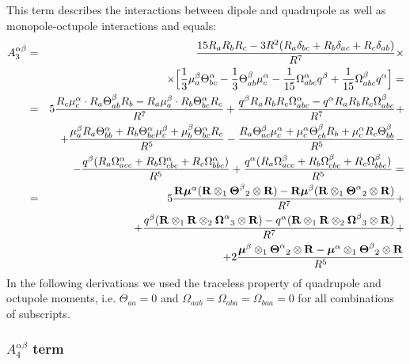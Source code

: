 \documentclass[a4paper,titlepage,twoside,fleqn]{article}
\newcommand{\BM}[1]{\ensuremath{\mbox{\boldmath${#1}$}}}
\begin{document}
This term describes the interactions between dipole 
and quadrupole as well as monopole-octupole interactions
and equals:
\begin{eqnarray}
A^{\alpha\beta}_3&=& \frac{15R_aR_bR_c-3R^2(R_a\delta_{bc}+R_b\delta_{ac}+R_c\delta_{ab})}{R^7} \times \\ \nonumber
& & \quad\times \Big[
           \frac{1}{3} {\mu}_a^{\beta} {\Theta}^{\alpha}_{bc} - 
           \frac{1}{3} {\Theta}^{\beta}_{ab} {\mu}_c^{\alpha} -
           \frac{1}{15} {\Omega}^{\alpha}_{abc} {q}^{\beta} +
           \frac{1}{15} {\Omega}^{\beta}_{abc} {q}^{\alpha}
           \Big] = \\ \nonumber
&=&
5\frac{R_c\mu_c^{\alpha} \cdot R_a\Theta_{ab}^{\beta}R_b - R_a\mu_a^{\beta} \cdot R_b\Theta_{bc}^{\alpha}R_c}{R^7} +
 \frac{ q^{\beta}R_aR_bR_c\Omega^{\alpha}_{abc} - q^{\alpha}R_aR_bR_c\Omega^{\beta}_{abc}    }{R^7} + \\ \nonumber
&&\quad+ 
\frac{\mu_a^{\beta}R_a\Theta_{bb}^{\alpha} + R_b\Theta_{bc}^{\alpha}\mu_c^{\beta} + \mu_b^{\beta}\Theta_{bc}^{\alpha}R_c }{R^5} -
\frac{R_a\Theta_{ac}^{\beta}\mu_c^{\alpha} + \mu_c^{\alpha}\Theta_{cb}^{\beta}R_b + \mu_c^{\alpha}R_c\Theta_{bb}^{\beta} }{R^5} - \\ \nonumber
&&\quad- 
\frac{q^{\beta}(R_a\Omega_{acc}^{\alpha} + R_b\Omega_{cbc}^{\alpha} + R_c\Omega_{bbc}^{\alpha})  }{R^5} +
\frac{q^{\alpha}(R_a\Omega_{acc}^{\beta} + R_b\Omega_{cbc}^{\beta} + R_c\Omega_{bbc}^{\beta})  }{R^5} = \\ \nonumber
&=&
5\frac{{\bf R}{\BM\mu}^{\alpha}( {\bf R}\otimes_1{\BM\Theta}^{\beta}{}_2\otimes{\bf R}) - 
       {\bf R}{\BM\mu}^{\beta} ( {\bf R}\otimes_1{\BM\Theta}^{\alpha}{}_2\otimes{\bf R})  }{R^7} + \\ \nonumber
&&\quad+
\frac{ q^{\beta}({\bf R}\otimes_1{\bf R}\otimes_2{\BM\Omega}^{\alpha}{}_3\otimes{\bf R}) - 
       q^{\alpha}({\bf R}\otimes_1{\bf R}\otimes_2{\BM\Omega}^{\beta}{}_3\otimes{\bf R})    }{R^7} + \\ \nonumber
&&\quad+
2\frac{   {\BM \mu}^{\beta}\otimes_1{\BM\Theta}^{\alpha}{}_2\otimes{\bf R} - 
          {\BM \mu}^{\alpha}\otimes_1{\BM\Theta}^{\beta}{}_2\otimes{\bf R}   }{R^5}
\end{eqnarray}
In the following derivations we used the traceless 
property of quadrupole and octupole moments, i.e.
$\Theta_{aa}=0$ and $\Omega_{aab}=\Omega_{aba}=\Omega_{baa}=0$
for all combinations of subscripts.

\subsubsection*{$A^{\alpha\beta}_4$ term}
\end{document}
